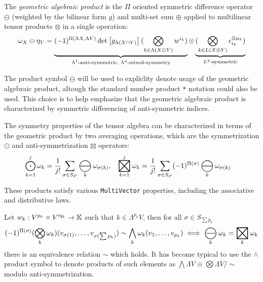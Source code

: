 \documentclass[]{article}
\DeclareMathOperator*{\bigboxtimes}{\scalerel*{\boxtimes}{\bigodot}}
\DeclareMathOperator*{\bigominus}{\scalerel*{\ominus}{\bigodot}}
\begin{document}
\begin{definition}
	The \textit{geometric algebraic product} is the $\Pi$ oriented symmetric difference operator $\ominus$ (weighted by the bilinear form $g$) and multi-set sum $\oplus$ applied to multilinear tensor products $\otimes$ in a single operation:
	$$ \omega_X\ominus \eta_Y = \ub{\text{$\Lambda^1$-anti-symmetric, $\Lambda^g$-mixed-symmetry}}{(-1)^{\Pi(\Lambda X,\Lambda Y)}\det\mat{g_{\Lambda(X\cap Y)}} (\bigotimes_{k\in \Lambda(X\ominus Y)} w^{i_k})}\otimes \ub{\text{$L^g$-symmetric}}{(\bigotimes_{k\in L(X\oplus Y)} \epsilon_{i_k}^{\otimes\mu_k})}$$
\end{definition}

\begin{note}
	The product symbol $\ominus$ will be used to expliclity denote usage of the geometric algebraic product, altough the standard number product \verb`*` notation could also be used. This choice is to help emphasize that the geometric algebraic product is characterized by symmetric differencing of anti-symmetric indices.
\end{note}

\begin{definition}
	The symmetry properties of the tensor algebra can be characterized in terms of the geometric product by two averaging operations, which are the symmetrization $\odot$ and anti-symmetrization $\boxtimes$ operators:
	\begin{align*}
		\bigodot_{k=1}^j \omega_k &= \frac1{j!}\sum_{\sigma\in S_P}\bigominus_k\omega_{\sigma(k)}, &
		\bigboxtimes_{k=1}^j \omega_k &= \frac1{j!}\sum_{\sigma\in S_P}(-1)^{\Pi(\sigma)}\bigominus_k\omega_{\sigma(k)}
	\end{align*}
\end{definition}
These products satisfy various \verb`MultiVector` properties, including the associative and distributive laws.

\begin{definition}
	Let $w_k:V^{p_k}\times V'^{q_k}\ra\mb K$ such that $k\in\Lambda^{p_k}V$, then for all $\sigma\in S_{\sum p_k}$
	$$ (-1)^{\Pi(\sigma)}(\bigotimes_k \omega_k)(v_{\sigma(1)},\dots,v_{\sigma(\sum p_k)}) \sim \bigwedge_k \omega_k(v_{1},\dots,v_{p_k}) \iff \bigominus_k\omega_k = \bigboxtimes_k\omega_k $$
	there is an equivalence relation $\sim$ which holds. It has become typical to use the $\wedge$ product symbol to denote products of such elements as $\bigwedge\Lambda V \equiv \bigotimes\Lambda V/\sim$ modulo anti-symmetrization.
\end{definition}
\end{document}

